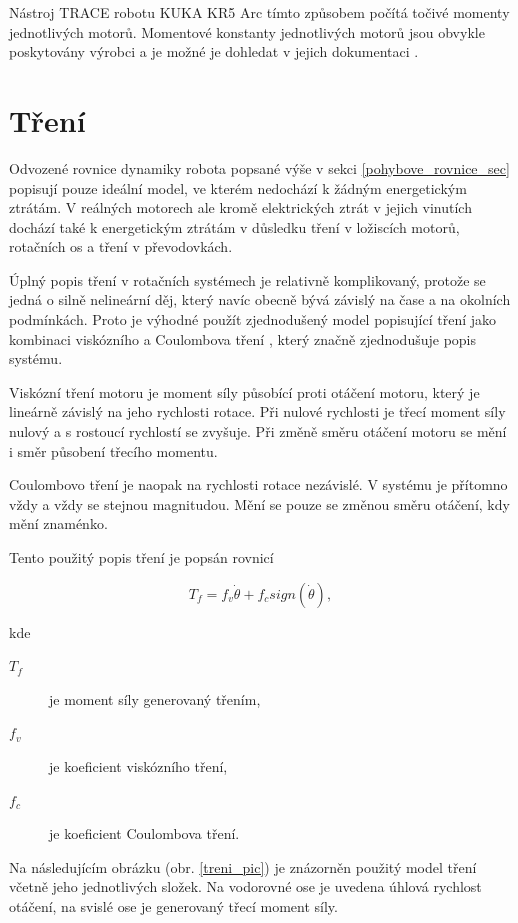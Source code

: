 Nástroj TRACE robotu KUKA KR5 Arc tímto způsobem počítá točivé momenty jednotlivých motorů. Momentové konstanty jednotlivých motorů jsou obvykle poskytovány výrobci a je možné je dohledat v jejich dokumentaci \cite{motor1}\cite{motor2}\cite{motor3}. 

\section{Tření}

Odvozené rovnice dynamiky robota popsané výše v sekci \ref{pohybove_rovnice_sec} popisují pouze ideální model, ve kterém nedochází k žádným energetickým ztrátám. V reálných motorech ale kromě elektrických ztrát v jejich vinutích dochází také k energetickým ztrátám v důsledku tření v ložiscích motorů, rotačních os a tření v převodovkách.

Úplný popis tření v rotačních systémech je relativně komplikovaný, protože se jedná o silně nelineární děj, který navíc obecně bývá závislý na čase a na okolních podmínkách. Proto je výhodné použít zjednodušený model popisující tření jako kombinaci viskózního a Coulombova tření \cite{fric_eff_analysis}, který značně zjednodušuje popis systému. 

Viskózní tření motoru je moment síly působící proti otáčení motoru, který je lineárně závislý na jeho rychlosti rotace. Při nulové rychlosti je třecí moment síly nulový a s rostoucí rychlostí se zvyšuje. Při změně směru otáčení motoru se mění i směr působení třecího momentu. 

Coulombovo tření je naopak na rychlosti rotace nezávislé. V systému je přítomno vždy a vždy se stejnou magnitudou. Mění se pouze se změnou směru otáčení, kdy mění znaménko.

Tento použitý popis tření je popsán rovnicí 

\begin{equation}
T_f = f_v\dot{\theta} + f_csign(\dot{\theta}),
\label{fric_eq}
\end{equation}

kde

\begin{description}
\item[$T_f$] je moment síly generovaný třením, 
\item[$f_v$] je koeficient viskózního tření, 
\item[$f_c$] je koeficient Coulombova tření. 
\end{description}

Na následujícím obrázku (obr. \ref{treni_pic}) je znázorněn použitý model tření včetně jeho jednotlivých složek. Na vodorovné ose je uvedena úhlová rychlost otáčení, na svislé ose je generovaný třecí moment síly.

